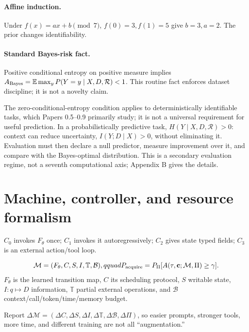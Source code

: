 \documentclass[10pt]{article}
\begin{document}
\paragraph{Affine induction.} Under $f(x)=ax+b\pmod7$, $f(0)=3,f(1)=5$ give $b=3,a=2$. The prior changes identifiability.
\paragraph{Standard Bayes-risk fact.} Positive conditional entropy on positive measure implies $A_{\rm Bayes}=\mathbb E\max_yP(Y=y\mid X,D,\mathcal R)<1$. This routine fact enforces dataset discipline; it is not a novelty claim.

The zero-conditional-entropy condition applies to deterministically identifiable tasks, which Papers 0.5--0.9 primarily study; it is not a universal requirement for useful prediction. In a probabilistically predictive task, $H(Y\mid X,D,\mathcal R)>0$: context can reduce uncertainty, $I(Y;D\mid X)>0$, without eliminating it. Evaluation must then declare a null predictor, measure improvement over it, and compare with the Bayes-optimal distribution. This is a secondary evaluation regime, not a seventh computational axis; Appendix B gives the details.

\section{Machine, controller, and resource formalism}
$C_0$ invokes $F_\theta$ once; $C_1$ invokes it autoregressively; $C_2$ gives state typed fields; $C_3$ is an external action/tool loop.
\begin{definition}
\[
\mathcal M=(F_\theta,C,S,I,\mathbb T,\mathcal B),qquad
P_{\rm acquire}=P_\Pi[A(\tau,\mathbf c;\mathcal M,\Pi)\ge\gamma].
\]
$F_\theta$ is the learned transition map, $C$ its scheduling protocol, $S$ writable state, $I:q\mapsto D$ information, $\mathbb T$ partial external operations, and $\mathcal B$ context/call/token/time/memory budget.
\end{definition}
Report $\Delta\mathcal M=(\Delta C,\Delta S,\Delta I,\Delta\mathbb T,\Delta\mathcal B,\Delta\Pi)$, so easier prompts, stronger tools, more time, and different training are not all ``augmentation.''
\end{document}
